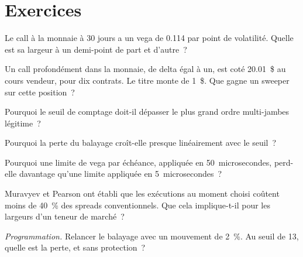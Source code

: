\section{Exercices}

\begin{exercise}[$\star$]\label{exo:hf:automated-options-market-making:1}
Le call à la monnaie à 30 jours a un vega de 0.114 par point de volatilité. Quelle est sa largeur à un demi-point de part et d'autre~?
\end{exercise}

\begin{exercise}[$\star$]\label{exo:hf:automated-options-market-making:2}
Un call profondément dans la monnaie, de delta égal à un, est coté 20.01~\$ au cours vendeur, pour dix contrats. Le titre monte de 1~\$. Que gagne un sweeper sur cette position~?
\end{exercise}

\begin{exercise}[$\star$]\label{exo:hf:automated-options-market-making:3}
Pourquoi le seuil de comptage doit-il dépasser le plus grand ordre multi-jambes légitime~?
\end{exercise}

\begin{exercise}[$\star\star$]\label{exo:hf:automated-options-market-making:4}
Pourquoi la perte du balayage croît-elle presque linéairement avec le seuil~?
\end{exercise}

\begin{exercise}[$\star\star$]\label{exo:hf:automated-options-market-making:5}
Pourquoi une limite de vega par échéance, appliquée en 50~microsecondes, perd-elle davantage qu'une limite appliquée en 5~microsecondes~?
\end{exercise}

\begin{exercise}[$\star\star$]\label{exo:hf:automated-options-market-making:6}
Muravyev et Pearson ont établi que les exécutions au moment choisi coûtent moins de 40~\% des spreads conventionnels. Que cela implique-t-il pour les largeurs d'un teneur de marché~?
\end{exercise}

\begin{exercise}[$\star\star\star$]\label{exo:hf:automated-options-market-making:7}
\emph{Programmation.} Relancer le balayage avec un mouvement de 2~\%. Au seuil de 13, quelle est la perte, et sans protection~?
\end{exercise}

